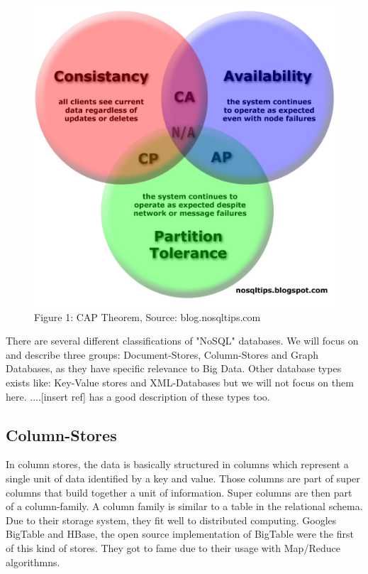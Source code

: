 \documentclass{acm_proc_article-sp}
\begin{document}
\begin{figure}[hbtp]
	\centering
	\includegraphics[scale=0.2]{CAP_Diagram_dist-copy.jpg}
	\caption{Figure 1: CAP Theorem, Source: blog.nosqltips.com}
\end{figure}

There are several different classifications of "NoSQL" databases. We will focus on and describe three groups: Document-Stores, Column-Stores and Graph Databases, as they have specific relevance to Big Data. Other database types exists like: Key-Value stores and XML-Databases but we will not focus on them here. ....[insert ref] has a good description of these types too.


	
	
\subsection{Column-Stores}

In column stores, the data is basically structured in columns which represent a single
unit of data identified by a key and value. Those columns are part of super columns that
build together a unit of information. Super columns are then part of a column-family.
A column family is similar to a table in the relational schema. Due to their storage system, they fit well to distributed computing. Googles BigTable and HBase, the open source implementation of BigTable were the first of this kind of stores. They got to fame due to their usage with Map/Reduce algorithmns. 
\end{document}
